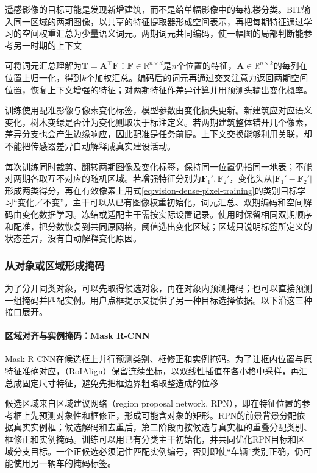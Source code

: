 遥感影像的目标可能是发现新增建筑，而不是给单幅影像中的每栋楼分类。BIT输入同一区域的两期图像，以共享的特征提取器形成空间表示，再把每期特征通过学习的空间权重汇总为少量语义词元。两期词元共同编码，使一幅图的局部判断能参考另一时期的上下文

可将词元汇总理解为$\bm{T}=\bm{A}^{\top}\bm{F}$：$\bm{F}\in\mathbb{R}^{n\times d}$是$n$个位置的特征，$\bm{A}\in\mathbb{R}^{n\times k}$的每列在位置上归一化，得到$k$个加权汇总。编码后的词元再通过交叉注意力返回两期空间位置，恢复上下文增强的特征；对两期特征作差异计算并用预测头输出变化概率。

训练使用配准影像与像素变化标签，模型参数由变化损失更新。新建筑应对应语义变化，树木变绿是否计为变化则取决于标注定义。若两期建筑整体错开几个像素，差异分支也会产生边缘响应，因此配准是任务前提。上下文交换能够利用关联，却不能把传感器差异自动解释成真实建设活动。

每次训练同时裁剪、翻转两期图像及变化标签，保持同一位置仍指同一地表；不能对两期各取互不对应的随机区域。若增强特征分别为$\bm{F}_1',\bm{F}_2'$，变化头从$|\bm{F}_1'-\bm{F}_2'|$形成两类得分，再在有效像素上用式\eqref{eq:vision-dense-pixel-training}的类别目标学习“变化／不变”。主干可以从已有图像权重初始化，词元汇总、双期编码和空间解码由变化数据学习。冻结或适配主干需按实际设置记录。使用时保留相同双期顺序和配准，把分数恢复到共同原网格，阈值选出变化区域；区域只说明标签所定义的状态差异，没有自动解释变化原因。

\subsubsection{从对象或区域形成掩码}
\label{sec:vision-recognition-mask-sets}

为了分开同类对象，可以先取得候选对象，再在对象内预测掩码；也可以直接预测一组掩码并匹配实例。用户点框提示又提供了另一种目标选择依据。以下沿这三种接口展开。

\paragraph{区域对齐与实例掩码：Mask R-CNN}
\label{sec:vision-recognition-mask-rcnn}

Mask R-CNN在候选框上并行预测类别、框修正和实例掩码。为了让框内位置与原特征准确对应，（RoIAlign）保留连续坐标，以双线性插值在各小格中采样，再汇总成固定尺寸特征，避免先把框边界粗略取整造成的位移

候选区域来自区域建议网络（region proposal network, RPN），即在特征位置的参考框上先预测对象性和框修正，形成可能含对象的矩形。RPN的前景背景分配依据真实实例框；候选解码和去重后，第二阶段再按候选与真实框的重叠分配类别、框修正和实例掩码。训练可以用已有分类主干初始化，并共同优化RPN目标和区域分支目标。一个正候选必须记住匹配实例编号，否则即使“车辆”类别正确，仍可能使用另一辆车的掩码标签。

